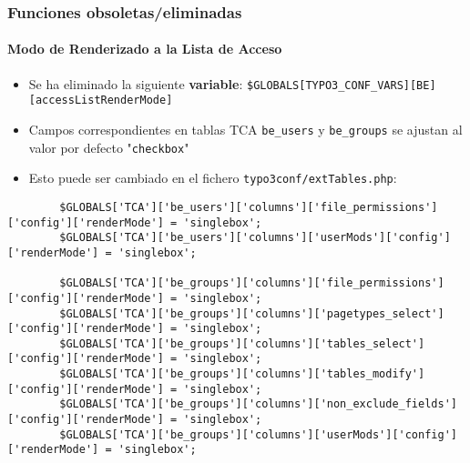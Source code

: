 
\begin{frame}[fragile]
	\frametitle{Funciones obsoletas/eliminadas}
	\framesubtitle{Modo de Renderizado a la Lista de Acceso}

	\lstset{basicstyle=\tiny\ttfamily}

	\begin{itemize}

		\item Se ha eliminado la siguiente \textbf{variable}:
			\small\texttt{\$GLOBALS[TYPO3\_CONF\_VARS][BE][accessListRenderMode]}\normalsize

		\item Campos correspondientes en tablas TCA \texttt{be\_users} y \texttt{be\_groups}
			se ajustan al valor por defecto "\texttt{checkbox}"

		\item Esto puede ser cambiado en el fichero \texttt{typo3conf/extTables.php}:

	\end{itemize}

	\begin{lstlisting}
		$GLOBALS['TCA']['be_users']['columns']['file_permissions']['config']['renderMode'] = 'singlebox';
		$GLOBALS['TCA']['be_users']['columns']['userMods']['config']['renderMode'] = 'singlebox';

		$GLOBALS['TCA']['be_groups']['columns']['file_permissions']['config']['renderMode'] = 'singlebox';
		$GLOBALS['TCA']['be_groups']['columns']['pagetypes_select']['config']['renderMode'] = 'singlebox';
		$GLOBALS['TCA']['be_groups']['columns']['tables_select']['config']['renderMode'] = 'singlebox';
		$GLOBALS['TCA']['be_groups']['columns']['tables_modify']['config']['renderMode'] = 'singlebox';
		$GLOBALS['TCA']['be_groups']['columns']['non_exclude_fields']['config']['renderMode'] = 'singlebox';
		$GLOBALS['TCA']['be_groups']['columns']['userMods']['config']['renderMode'] = 'singlebox';
	\end{lstlisting}

\end{frame}

